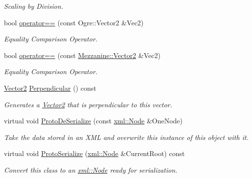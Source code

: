 \begin{DoxyCompactItemize}
\begin{DoxyCompactList}\small\item\em Scaling by Division. \item\end{DoxyCompactList}\item 
bool \hyperlink{classMezzanine_1_1Vector2_a790134b37da0df462c66c0013f25c681}{operator==} (const Ogre::Vector2 \&Vec2)
\begin{DoxyCompactList}\small\item\em Equality Comparison Operator. \item\end{DoxyCompactList}\item 
bool \hyperlink{classMezzanine_1_1Vector2_a62ea76da87eee960f8bd373a6243e9a2}{operator==} (const \hyperlink{classMezzanine_1_1Vector2}{Mezzanine::Vector2} \&Vec2)
\begin{DoxyCompactList}\small\item\em Equality Comparison Operator. \item\end{DoxyCompactList}\item 
\hyperlink{classMezzanine_1_1Vector2}{Vector2} \hyperlink{classMezzanine_1_1Vector2_a89fc738d8ff02d46ca9580e9a1db33fe}{Perpendicular} () const 
\begin{DoxyCompactList}\small\item\em Generates a \hyperlink{classMezzanine_1_1Vector2}{Vector2} that is perpendicular to this vector. \item\end{DoxyCompactList}\item 
virtual void \hyperlink{classMezzanine_1_1Vector2_a59e88e00f590a4cf5c59b5175aff974d}{ProtoDeSerialize} (const \hyperlink{classMezzanine_1_1xml_1_1Node}{xml::Node} \&OneNode)
\begin{DoxyCompactList}\small\item\em Take the data stored in an XML and overwrite this instance of this object with it. \item\end{DoxyCompactList}\item 
virtual void \hyperlink{classMezzanine_1_1Vector2_aa33e0db70e7a5f60077ca4b7af158545}{ProtoSerialize} (\hyperlink{classMezzanine_1_1xml_1_1Node}{xml::Node} \&CurrentRoot) const 
\begin{DoxyCompactList}\small\item\em Convert this class to an \hyperlink{classMezzanine_1_1xml_1_1Node}{xml::Node} ready for serialization. \item\end{DoxyCompactList}\end{DoxyCompactItemize}

